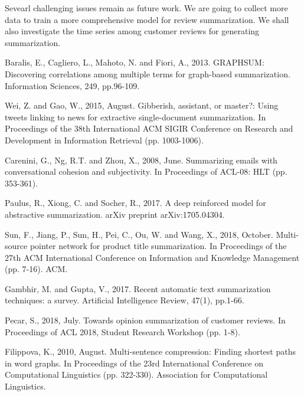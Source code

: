 \documentclass[letterpaper]{article}
\begin{document}
Sevearl challenging issues remain as future work. We are going to collect more data to train a more comprehensive model for review summarization. We shall also investigate the time series among customer reviews for generating summarization.

 
\begin{thebibliography}{}

Baralis, E., Cagliero, L., Mahoto, N. and Fiori, A., 2013. GRAPHSUM: Discovering correlations among multiple terms for graph-based summarization. Information Sciences, 249, pp.96-109.

Wei, Z. and Gao, W., 2015, August. Gibberish, assistant, or master?: Using tweets linking to news for extractive single-document summarization. In Proceedings of the 38th International ACM SIGIR Conference on Research and Development in Information Retrieval (pp. 1003-1006).

Carenini, G., Ng, R.T. and Zhou, X., 2008, June. Summarizing emails with conversational cohesion and subjectivity. In Proceedings of ACL-08: HLT (pp. 353-361).

Paulus, R., Xiong, C. and Socher, R., 2017. A deep reinforced model for abstractive summarization. arXiv preprint arXiv:1705.04304.

Sun, F., Jiang, P., Sun, H., Pei, C., Ou, W. and Wang, X., 2018, October. Multi-source pointer network for product title summarization. In Proceedings of the 27th ACM International Conference on Information and Knowledge Management (pp. 7-16). ACM.

Gambhir, M. and Gupta, V., 2017. Recent automatic text summarization techniques: a survey. Artificial Intelligence Review, 47(1), pp.1-66.

Pecar, S., 2018, July. Towards opinion summarization of customer reviews. In Proceedings of ACL 2018, Student Research Workshop (pp. 1-8).

Filippova, K., 2010, August. Multi-sentence compression: Finding shortest paths in word graphs. In Proceedings of the 23rd International Conference on Computational Linguistics (pp. 322-330). Association for Computational Linguistics.


\end{thebibliography}
\end{document}
